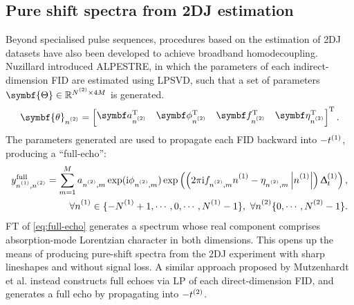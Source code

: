 \subsection{Pure shift spectra from 2DJ estimation}

Beyond specialised pulse sequences, procedures based on the estimation of
\ac{2DJ} datasets have also been developed to achieve broadband homodecoupling.
Nuzillard introduced \ac{ALPESTRE}\cite{Nuzillard1996,Martinez2012}, in which
the parameters of each indirect-dimension FID are estimated using \ac{LPSVD},
such that a set of parameters $\symbf{\Theta} \in \mathbb{R}^{\Ntwo
\times 4M}$ is generated.
\begin{equation}
    \symbf{\theta}_{\ntwo} =
    \begin{bmatrix}
        \bda_{\ntwo}\T &
        \bdphi_{\ntwo}\T &
        \bdf_{\ntwo}\T &
        \bdeta_{\ntwo}\T
    \end{bmatrix}\T.
\end{equation}
The parameters generated are used to propagate each FID backward into
$-t^{(1)}$, producing a ``full-echo'':
\begin{equation}
    \begin{split}
        y^{\text{full}}_{\none,\ntwo} = \sum_{m=1}^{M}
            a_{\ntwo,m}
            \exp(\iu \phi_{\ntwo,m})
            \exp\left(\left(2 \pi \iu f_{\ntwo,m} \none
            -\eta_{\ntwo,m}  \left\lvert \none \right\rvert \right)\Dtone\right), \\
        \forall \none \in \lbrace -\None + 1, \cdots, 0, \cdots, \None - 1 \rbrace,\ \forall \ntwo \lbrace 0, \cdots, \Ntwo - 1 \rbrace.
    \end{split}
    \label{eq:full-echo}
\end{equation}
\ac{FT} of \eqref{eq:full-echo} generates a spectrum whose real component comprises absorption-mode
Lorentzian character in both dimensions. This opens up the means of producing
pure-shift spectra from the \ac{2DJ} experiment with sharp lineshapes and
without signal loss. A similar approach proposed by Mutzenhardt et al.
instead constructs full echoes via \ac{LP} of each direct-dimension
\ac{FID}, and generates a full echo by propagating into
$-t^{(2)}$\cite{Mutzenhardt1999}.


